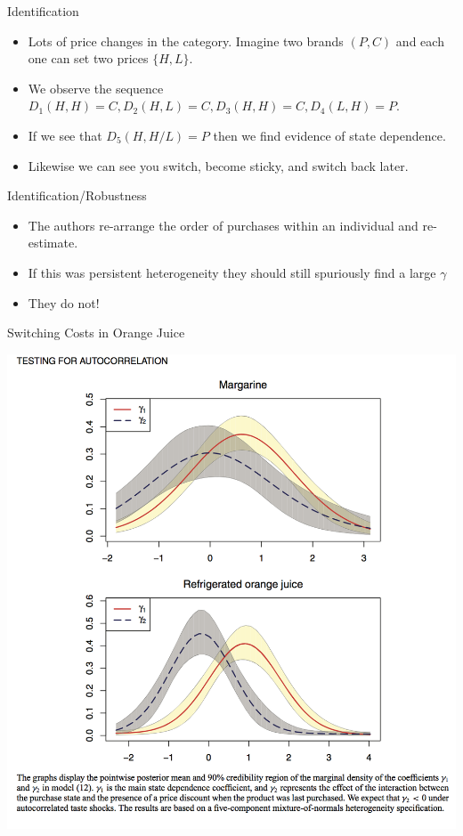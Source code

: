 \documentclass[xcolor=pdftex,dvipsnames,table,mathserif,aspectratio=169]{beamer}
\begin{document}
\begin{frame}{Identification}
\begin{itemize}
\item Lots of price changes in the category. Imagine two brands $(P,C)$ and each one can set two prices $\{H,L\}$.
\item We observe the sequence $D_1(H,H) = C, D_2(H,L) = C, D_3(H,H) = C, D_4(L,H) = P$.
\item If we see that $D_5(H,H/L) = P$ then we find evidence of state dependence.
\item Likewise we can see you switch, become sticky, and switch back later.
\end{itemize}
\end{frame} 

\begin{frame}{Identification/Robustness}
\begin{itemize}
\item The authors re-arrange the order of purchases within an individual and re-estimate.
\item If this was persistent heterogeneity they should still spuriously find a large $\gamma$
\item They do not!
\end{itemize}
\end{frame}
 
\begin{frame}{Switching Costs in Orange Juice}
\begin{center}
\includegraphics[scale=0.33]{resources/OJ_F5.png}
\end{center}
\end{frame}
\end{document}
